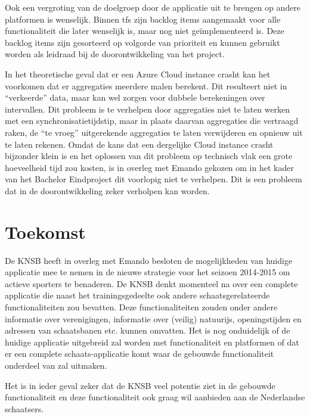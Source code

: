 Ook een vergroting van de doelgroep door de applicatie uit te brengen op andere platformen is wenselijk. Binnen \ac{tfs} zijn backlog items aangemaakt voor alle functionaliteit die later wenselijk is, maar nog niet geïmplementeerd is. Deze backlog items zijn gesorteerd op volgorde van prioriteit en kunnen gebruikt worden als leidraad bij de doorontwikkeling van het project.

In het theoretische geval dat er een Azure Cloud instance crasht kan het voorkomen dat er aggregaties meerdere malen berekent. Dit resulteert niet in ``verkeerde'' data, maar kan wel zorgen voor dubbele berekeningen over intervallen. Dit probleem is te verhelpen door aggregaties niet te laten werken met een synchronisatietijdstip, maar in plaats daarvan aggregaties die vertraagd raken, de ``te vroeg'' uitgerekende aggregaties te laten verwijderen en opnieuw uit te laten rekenen. Omdat de kans dat een dergelijke Cloud instance crasht bijzonder klein is en het oplossen van dit probleem op technisch vlak een grote hoeveelheid tijd zou kosten, is in overleg met Emando gekozen om in het kader van het Bachelor Eindproject dit voorlopig niet te verhelpen. Dit is een probleem dat in de doorontwikkeling zeker verholpen kan worden.

\section{Toekomst}
De \ac{KNSB} heeft in overleg met Emando besloten de mogelijkheden van huidige applicatie mee te nemen in de nieuwe strategie voor het seizoen 2014-2015 om actieve sporters te benaderen. De \ac{KNSB} denkt momenteel na over een complete applicatie die naast het trainingsgedeelte ook andere schaatsgerelateerde functionaliteiten zou bevatten. Deze functionaliteiten zouden onder andere informatie over verenigingen, informatie over (veilig) natuurijs, openingstijden en adressen van schaatsbanen etc. kunnen omvatten. Het is nog onduidelijk of de huidige applicatie uitgebreid zal worden met functionaliteit en platformen of dat er een complete schaats-applicatie komt waar de gebouwde functionaliteit onderdeel van zal uitmaken. 

Het is in ieder geval zeker dat de \ac{KNSB} veel potentie ziet in de gebouwde functionaliteit en deze functionaliteit ook graag wil aanbieden aan de Nederlandse schaatsers.